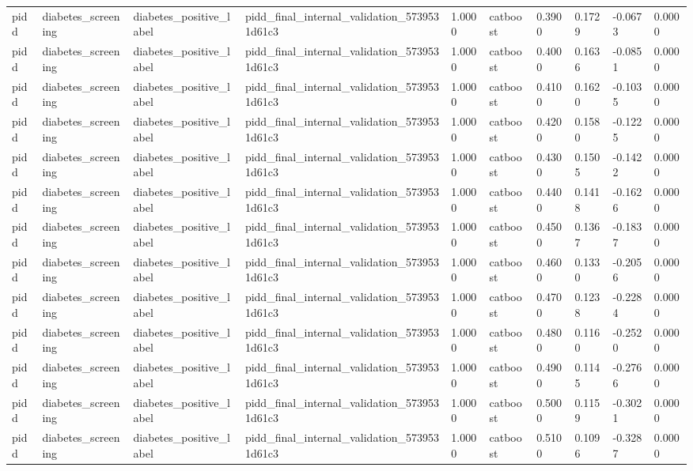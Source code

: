 \begin{tabular}{llllllllll}
pidd & diabetes\_screening & diabetes\_positive\_label & pidd\_final\_internal\_validation\_5739531d61c3 & 1.0000 & catboost & 0.3900 & 0.1729 & -0.0673 & 0.0000 \\
pidd & diabetes\_screening & diabetes\_positive\_label & pidd\_final\_internal\_validation\_5739531d61c3 & 1.0000 & catboost & 0.4000 & 0.1636 & -0.0851 & 0.0000 \\
pidd & diabetes\_screening & diabetes\_positive\_label & pidd\_final\_internal\_validation\_5739531d61c3 & 1.0000 & catboost & 0.4100 & 0.1620 & -0.1035 & 0.0000 \\
pidd & diabetes\_screening & diabetes\_positive\_label & pidd\_final\_internal\_validation\_5739531d61c3 & 1.0000 & catboost & 0.4200 & 0.1580 & -0.1225 & 0.0000 \\
pidd & diabetes\_screening & diabetes\_positive\_label & pidd\_final\_internal\_validation\_5739531d61c3 & 1.0000 & catboost & 0.4300 & 0.1505 & -0.1422 & 0.0000 \\
pidd & diabetes\_screening & diabetes\_positive\_label & pidd\_final\_internal\_validation\_5739531d61c3 & 1.0000 & catboost & 0.4400 & 0.1418 & -0.1626 & 0.0000 \\
pidd & diabetes\_screening & diabetes\_positive\_label & pidd\_final\_internal\_validation\_5739531d61c3 & 1.0000 & catboost & 0.4500 & 0.1367 & -0.1837 & 0.0000 \\
pidd & diabetes\_screening & diabetes\_positive\_label & pidd\_final\_internal\_validation\_5739531d61c3 & 1.0000 & catboost & 0.4600 & 0.1330 & -0.2056 & 0.0000 \\
pidd & diabetes\_screening & diabetes\_positive\_label & pidd\_final\_internal\_validation\_5739531d61c3 & 1.0000 & catboost & 0.4700 & 0.1238 & -0.2284 & 0.0000 \\
pidd & diabetes\_screening & diabetes\_positive\_label & pidd\_final\_internal\_validation\_5739531d61c3 & 1.0000 & catboost & 0.4800 & 0.1160 & -0.2520 & 0.0000 \\
pidd & diabetes\_screening & diabetes\_positive\_label & pidd\_final\_internal\_validation\_5739531d61c3 & 1.0000 & catboost & 0.4900 & 0.1145 & -0.2766 & 0.0000 \\
pidd & diabetes\_screening & diabetes\_positive\_label & pidd\_final\_internal\_validation\_5739531d61c3 & 1.0000 & catboost & 0.5000 & 0.1159 & -0.3021 & 0.0000 \\
pidd & diabetes\_screening & diabetes\_positive\_label & pidd\_final\_internal\_validation\_5739531d61c3 & 1.0000 & catboost & 0.5100 & 0.1096 & -0.3287 & 0.0000 \\

\end{tabular}
